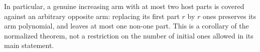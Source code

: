 In particular, a genuine increasing arm with at most two host
parts is covered against an arbitrary opposite arm: replacing
its first part $r$ by $r$ ones preserves its arm polynomial,
and leaves at most one non-one part. This is a corollary of
the normalized theorem, not a restriction on the number of
initial ones allowed in its main statement.
